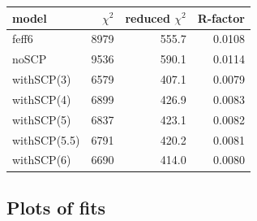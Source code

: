 \documentclass[11pt]{article}
\begin{document}
\begin{center}
  \begin{tabular}{lrrr}
    model & $\chi^2$ & reduced $\chi^2$ & R-factor\\
    \hline
    feff6        & 8979 & 555.7 & 0.0108\\
    noSCP        & 9536 & 590.1 & 0.0114\\
    withSCP(3)   & 6579 & 407.1 & 0.0079\\
    withSCP(4)   & 6899 & 426.9 & 0.0083\\
    withSCP(5)   & 6837 & 423.1 & 0.0082\\
    withSCP(5.5) & 6791 & 420.2 & 0.0081\\
    withSCP(6)   & 6690 & 414.0 & 0.0080\\
  \end{tabular}
\end{center}





\subsection{Plots of fits}
\label{sec:orgheadline29}
\end{document}
